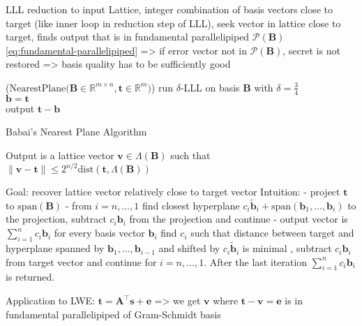 {%
LLL reduction to input Lattice, integer combination of basis vectors close to target (like inner loop in reduction step of LLL), seek vector in lattice close to target, finds output that is in fundamental parallelipiped $\mathcal{P}(\mathbf{B})$ \cref{eq:fundamental-parallelipiped} => if error vector not in $\mathcal{P}(\mathbf{B})$, secret is not restored %
=> basis quality has to be sufficiently good
\begin{algorithm2e}
\Begin($\text{NearestPlane} {(}\mathbf{B} \in \mathbb{R}^{m \times n},\mathbf{t}\in \mathbb{R}^{m}{)}$)
{
  run $\delta$-LLL on basis $\mathbf{B}$ with $\delta=\frac{3}{4}$\\ %
  $\mathbf{b} = \mathbf{t}$\\
  output $\mathbf{t} - \mathbf{b}$
}
\caption{Babai's Nearest Plane Algorithm \cite{Bab85}}\label{alg:babai} %
\end{algorithm2e}

Output is a lattice vector $\mathbf{v} \in \Lambda(\mathbf{B})$ such that $\|\mathbf{v} - \mathbf{t}\| \leq 2^{n/2} \text{dist}(\mathbf{t}, \Lambda(\mathbf{B}))$ %

Goal: recover lattice vector relatively close to target vector
Intuition:
 - project $\mathbf{t}$ to $\text{span}(\mathbf{B})$
 - from $i=n, \dots, 1$ find closest hyperplane $c_i \tilde{\mathbf{b}}_i + \text{span}(\mathbf{b}_1, \dots, \mathbf{b}_i)$ to the projection, subtract $c_i \mathbf{b}_i$ from the projection and continue %
 - output vector is $\sum_{i=1}^n c_i \mathbf{b}_i$
for every basis vector $\mathbf{b}_i$ find $c_i$ such that distance between target and hyperplane spanned by $\mathbf{b}_1, ..., \mathbf{b}_{i-1}$ and shifted by $c_i \tilde{\mathbf{b}}_i$  is minimal %
, subtract $c_i \mathbf{b}_i$ from target vector and continue for $i=n, \dots, 1$. After the last iteration $\sum_{i=1}^n  c_i \mathbf{b}_i$ is returned. 

Application to LWE: $\mathbf{t} = \mathbf{A}^\intercal\mathbf{s}+\mathbf{e}$ => we get $\mathbf{v}$ where $\mathbf{t}- \mathbf{v} = \mathbf{e}$ is in fundamental parallelipiped of Gram-Schmidt basis


}
